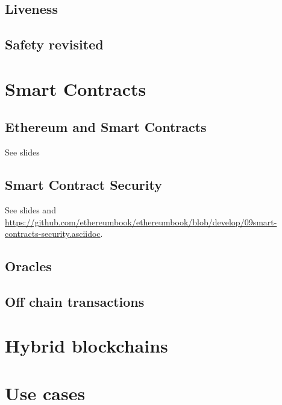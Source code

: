 \documentclass[a4paper,11pt,draft]{report}
\begin{document}
	\section{Liveness}
	\label{sec:live}
	
	
	\section{Safety revisited}
	\label{sec:safe2}
	
	
\chapter{Smart Contracts}

	\section{Ethereum and Smart Contracts}
	See slides 

	\section{Smart Contract Security}
	See slides and \url{https://github.com/ethereumbook/ethereumbook/blob/develop/09smart-contracts-security.asciidoc}.
	
	\section{Oracles}
	
	\section{Off chain transactions}

\chapter{Hybrid blockchains}
	\label{ch:hybrid}
	
	
\chapter{Use cases}
	\label{ch:useCases}
	
	
\end{document}
